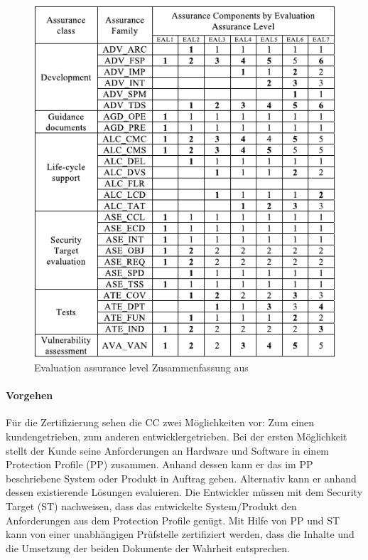 \documentclass[11pt,a4paper]{report}
\begin{document}
\begin{figure}[htb]
\centering
\includegraphics[scale=1.2]{images/cc_eal_table.pdf}
\caption[]{Evaluation assurance level Zusammenfassung aus \cite{bsi_ccguide}}
\label{fig:eal_sum}
\end{figure}

\paragraph{Vorgehen}

Für die Zertifizierung sehen die CC zwei Möglichkeiten vor: Zum einen kundengetrieben, zum anderen entwicklergetrieben. Bei der ersten Möglichkeit stellt der Kunde seine Anforderungen an Hardware und Software in einem Protection Profile (PP) zusammen. Anhand dessen kann er das im PP beschriebene System oder Produkt in Auftrag geben. Alternativ kann er anhand dessen existierende Lösungen evaluieren. Die Entwickler müssen mit dem Security Target (ST) nachweisen, dass das entwickelte System/Produkt den Anforderungen aus dem Protection Profile genügt. Mit Hilfe von PP und ST kann von einer unabhängigen Prüfstelle zertifiziert werden, dass die Inhalte und die Umsetzung der beiden Dokumente der Wahrheit entsprechen.
\end{document}
